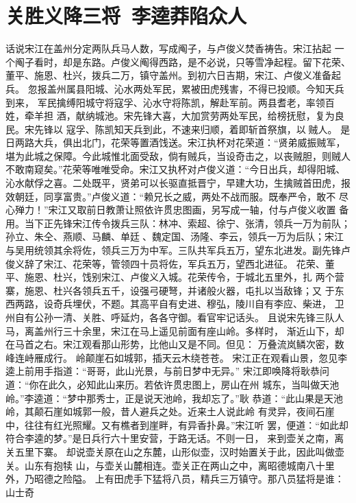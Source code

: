 \chapter{关胜义降三将~李逵莽陷众人}

话说宋江在盖州分定两队兵马人数，写成阄子，与卢俊义焚香祷告。宋江拈起
一个阄子看时，却是东路。卢俊义阄得西路，是不必说，只等雪净起程。留下花荣、
董平、施恩、杜兴，拨兵二万，镇守盖州。到初六日吉期，宋江、卢俊义准备起兵。
忽报盖州属县阳城、沁水两处军民，累被田虎残害，不得已投顺。今知天兵到来，
军民擒缚阳城守将寇孚、沁水守将陈凯，解赴军前。两县耆老，率领百姓，牵羊担
酒，献纳城池。宋先锋大喜，大加赏劳两处军民，给榜抚慰，复为良民。宋先锋以
寇孚、陈凯知天兵到此，不速来归顺，着即斩首祭旗，以贼人。
是日两路大兵，俱出北门，花荣等置酒饯送。宋江执杯对花荣道：“贤弟威振贼军，
堪为此城之保障。今此城惟北面受敌，倘有贼兵，当设奇击之，以丧贼胆，则贼人
不敢南窥矣。”花荣等唯唯受命。宋江又执杯对卢俊义道：“今日出兵，却得阳城、
沁水献俘之喜。二处既平，贤弟可以长驱直抵晋宁，早建大功，生擒贼首田虎，报
效朝廷，同享富贵。”卢俊义道：“赖兄长之威，两处不战而服。既奉严令，敢不
尽心殚力！”宋江又取前日教萧让照依许贯忠图画，另写成一轴，付与卢俊义收置
备用。当下正先锋宋江传令拨兵三队：林冲、索超、徐宁、张清，领兵一万为前队；
孙立、朱仝、燕顺、马麟、单廷、魏定国、汤隆、李云，领兵一万为后队；宋江
与吴用统领其余将佐，领兵三万为中军。三队共军兵五万，望东北进发。副先锋卢
俊义辞了宋江、花荣等，管领四十员将佐，军兵五万，望西北进征。
花荣、董平、施恩、杜兴，饯别宋江、卢俊义入城。花荣传令，于城北五里外，扎
两个营寨，施恩、杜兴各领兵五千，设强弓硬弩，并诸般火器，屯扎以当敌锋；又
于东西两路，设奇兵埋伏，不题。其高平自有史进、穆弘，陵川自有李应、柴进，
卫州自有公孙一清、关胜、呼延灼，各各守御。看官牢记话头。
且说宋先锋三队人马，离盖州行三十余里，宋江在马上遥见前面有座山岭。多样时，
渐近山下，却在马首之右。宋江观看那山形势，比他山又是不同。但见：
万叠流岚鳞次密，数峰连峙雁成行。
岭颠崖石如城郭，插天云木绕苍苍。
宋江正在观看山景，忽见李逵上前用手指道：“哥哥，此山光景，与前日梦中无异。”
宋江即唤降将耿恭问道：“你在此久，必知此山来历。若依许贯忠图上，房山在州
城东，当叫做天池岭。”李逵道：“梦中那秀士，正是说天池岭，我却忘了。”耿
恭道：“此山果是天池岭，其颠石崖如城郭一般，昔人避兵之处。近来土人说此岭
有灵异，夜间石崖中，往往有红光照耀。又有樵者到崖畔，有异香扑鼻。”宋江听
罢，便道：“如此却符合李逵的梦。”是日兵行六十里安营，于路无话。不则一日，
来到壶关之南，离关五里下寨。
却说壶关原在山之东麓，山形似壶，汉时始置关于此，因此叫做壶关。山东有抱犊
山，与壶关山麓相连。壶关正在两山之中，离昭德城南八十里外，乃昭德之险隘。
上有田虎手下猛将八员，精兵三万镇守。那八员猛将是谁：
山士奇

